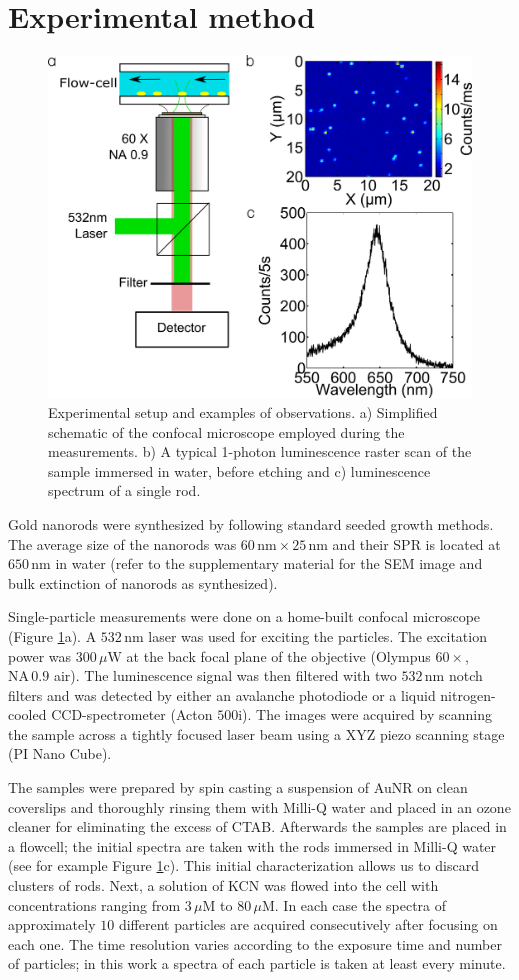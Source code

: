 \documentclass[a4paper,oneside,onecolumn]{article}
\newcommand{\nm}{\ensuremath{\,\textrm{nm}}}
\newcommand{\uM}{\ensuremath{\,\mu\textrm{M}}}
\newcommand{\uW}{\ensuremath{\,\mu\textrm{W}}}
\begin{document}
\section{Experimental method}
\begin{figure}[p]
 \centering \includegraphics[width=0.45\linewidth]{Figures/01_Setup/setup_1.png}
 \caption{Experimental setup and examples of observations. a) Simplified
 schematic of the confocal microscope employed during the measurements. b) A
 typical 1-photon luminescence raster scan of the sample immersed in
 water, before etching and c) luminescence spectrum of a single rod.}
 \label{fig:setup}
\end{figure}

Gold nanorods were synthesized by following standard seeded growth
methods\cite{Nikoobakht2003}. The average size of the nanorods was $60\nm\times
25\nm$ and their SPR is located at $650\nm$ in water (refer to the
supplementary material for the SEM image and bulk extinction of nanorods as
synthesized).

Single-particle measurements were done on a home-built confocal microscope
(Figure \ref{fig:setup}a). A $532\nm$ laser was used for exciting the particles.
The excitation power was $300\uW$ at the back focal plane of the objective
(Olympus $60\times$, $\textrm{NA}\,0.9$ air). The luminescence signal was then
filtered with two $532\nm$ notch filters and was detected by either an avalanche
photodiode or a liquid nitrogen-cooled CCD-spectrometer (Acton $500\textrm{i}$).
The images were acquired by scanning the sample across a tightly focused laser
beam using a XYZ piezo scanning stage (PI Nano Cube).

The samples were prepared by spin casting a suspension of AuNR on clean
coverslips and thoroughly rinsing them  with Milli-Q water and placed in an
ozone cleaner for eliminating the excess of CTAB. Afterwards the samples are
placed in a flowcell; the initial spectra are taken with the rods immersed in
Milli-Q water (see for example Figure \ref{fig:setup}c). This initial
characterization allows us to discard clusters of rods\cite{Funston2009}.
Next, a solution of KCN was flowed into the cell with concentrations ranging
from $3\uM$ to $80\uM$. In each case the spectra of approximately $10$
different particles are acquired consecutively after focusing on each one. The
time resolution varies according to the exposure time and number of particles;
in this work a spectra of each particle is taken at least every minute.
\end{document}
